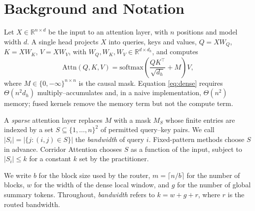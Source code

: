 \section{Background and Notation}\label{sec:background}

Let $X \in \mathbb{R}^{n \times d}$ be the input to an attention layer, with
$n$ positions and model width $d$. A single head projects $X$ into queries,
keys and values, $Q = XW_Q$, $K = XW_K$, $V = XW_V$, with
$W_Q, W_K, W_V \in \mathbb{R}^{d \times d_h}$, and computes
\begin{equation}\label{eq:dense}
  \mathrm{Attn}(Q, K, V) = \mathrm{softmax}\!\left(
    \frac{QK^{\top}}{\sqrt{d_h}} + M \right) V,
\end{equation}
where $M \in \{0, -\infty\}^{n \times n}$ is the causal mask. Equation
\eqref{eq:dense} requires $\Theta(n^2 d_h)$ multiply--accumulates and, in a
naive implementation, $\Theta(n^2)$ memory; fused kernels
\citep{dao2022flashattention} remove the memory term but not the compute term.

A \emph{sparse} attention layer replaces $M$ with a mask $M_S$ whose finite
entries are indexed by a set $S \subseteq \{1,\dots,n\}^2$ of permitted
query--key pairs. We call $|S_i| = |\{j : (i,j) \in S\}|$ the
\emph{bandwidth} of query $i$. Fixed-pattern methods choose $S$ in advance.
Corridor Attention chooses $S$ as a function of the input, subject to
$|S_i| \le k$ for a constant $k$ set by the practitioner.

We write $b$ for the block size used by the router, $m = \lceil n/b \rceil$ for
the number of blocks, $w$ for the width of the dense local window, and $g$ for
the number of global summary tokens. Throughout, \emph{bandwidth} refers to
$k = w + g + r$, where $r$ is the routed bandwidth.


